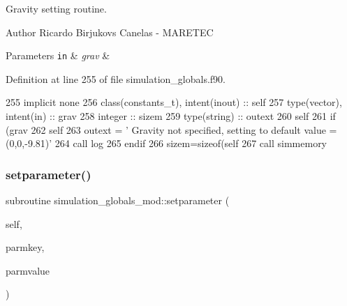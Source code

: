 Gravity setting routine. 

\begin{DoxyAuthor}{Author}
Ricardo Birjukovs Canelas -\/ M\+A\+R\+E\+T\+EC
\end{DoxyAuthor}

\begin{DoxyParams}[1]{Parameters}
\mbox{\tt in}  & {\em grav} & \\
\hline
\end{DoxyParams}


Definition at line 255 of file simulation\+\_\+globals.\+f90.


\begin{DoxyCode}
255     \textcolor{keywordtype}{implicit none}
256     \textcolor{keywordtype}{class}(constants\_t), \textcolor{keywordtype}{intent(inout)} :: self
257     \textcolor{keywordtype}{type}(vector), \textcolor{keywordtype}{intent(in)} :: grav
258     \textcolor{keywordtype}{integer} :: sizem
259     \textcolor{keywordtype}{type}(string) :: outext
260     self%
261     \textcolor{keywordflow}{if} (grav%
262         self%
263         outext = \textcolor{stringliteral}{'       Gravity not specified, setting to default value = (0,0,-9.81)'}
264         \textcolor{keyword}{call }log%
265 \textcolor{keywordflow}{    endif}
266     sizem=sizeof(self%
267     \textcolor{keyword}{call }simmemory%
\end{DoxyCode}
\mbox{\label{namespacesimulation__globals__mod_a8a05831d4c3e3eb5741d65978f6fcf61}} 
\subsubsection{\texorpdfstring{setparameter()}{setparameter()}}
{\footnotesize\ttfamily subroutine simulation\+\_\+globals\+\_\+mod\+::setparameter (\begin{DoxyParamCaption}\item[{class(\mbox{\hyperlink{structsimulation__globals__mod_1_1parameters__t}{parameters\+\_\+t}}), intent(inout)}]{self,  }\item[{type(string), intent(in)}]{parmkey,  }\item[{type(string), intent(in)}]{parmvalue }\end{DoxyParamCaption})\hspace{0.3cm}{\ttfamily [private]}}



